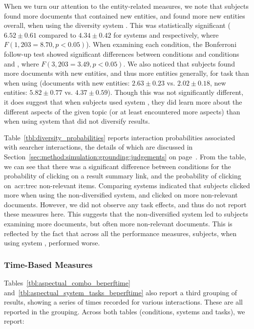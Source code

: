 When we turn our attention to the entity-related measures, we note that subjects found more documents that contained new entities, and found more new entities overall, when using the diversity system . This was statistically significant ($6.52\pm0.61$ compared to $4.34\pm0.42$ for systems  and  respectively, where $F(1,203 = 8.70, p<0.05)$). When examining each condition, the Bonferroni follow-up test showed significant differences between conditions  and conditions  and , where $F(3,203 = 3.49, p < 0.05)$. We also noticed that subjects found more documents with new entities, and thus more entities generally, for task  than when using  (documents with new entities: $2.63\pm0.23$ vs. $2.02\pm0.18$, new entities: $5.82\pm0.77$ vs. $4.37\pm0.59$). Though this was not significantly different, it does suggest that when subjects used system , they did learn more about the different aspects of the given topic (or at least encountered more aspects) than when using system  that did not diversify results.

Table~\ref{tbl:diversity_probabilities} reports interaction probabilities associated with searcher interactions, the details of which are discussed in Section~\ref{sec:method:simulation:grounding:judgements} on page~\pageref{sec:method:simulation:grounding:judgements}. From the table, we can see that there was a significant difference between conditions for the probability of clicking on a result summary link, and the probability of clicking on~\gls{acr:trec} non-relevant items. Comparing systems indicated that subjects clicked more when using the non-diversified system, and clicked on more non-relevant documents. However, we did not observe any task effects, and thus do not report these measures here. This suggests that the non-diversified system  led to subjects examining more documents, but often more non-relevant documents. This is reflected by the fact that across all the performance measures, subjects, when using system , performed worse.

\subsubsection{Time-Based Measures}
Tables~\ref{tbl:aspectual_combo_beperftime} and~\ref{tbl:aspectual_system_tasks_beperftime} also report a third grouping of results, showing a series of times recorded for various interactions. These are all reported in the  grouping. Across both tables (conditions, systems and tasks), we report:


